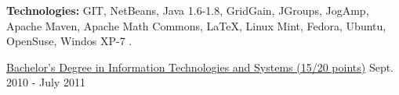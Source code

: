 \begin{cventries}
{\begin{cvitems}
        \item[] {\textbf{Technologies:} \textcolor{rainbowcolor-green}{GIT}, \textcolor{rainbowcolor-green}{NetBeans}, \textcolor{rainbowcolor-indigo}{Java 1.6-1.8}, \textcolor{rainbowcolor-indigo}{GridGain}, \textcolor{rainbowcolor-indigo}{JGroups}, \textcolor{rainbowcolor-indigo}{JogAmp}, \textcolor{rainbowcolor-indigo}{Apache Maven}, \textcolor{rainbowcolor-indigo}{Apache Math Commons}, %
\textcolor{rainbowcolor-indigo}{LaTeX}, %
\textcolor{rainbowcolor-orange}{Linux Mint}, \textcolor{rainbowcolor-orange}{Fedora}, \textcolor{rainbowcolor-orange}{Ubuntu}, \textcolor{rainbowcolor-orange}{OpenSuse}, \textcolor{rainbowcolor-orange}{Windos XP-7}
		.}
      \end{cvitems}
    }
  \cventry
    {\href{https://www.ubi.pt/en/course/64}{Bachelor's Degree in Information Technologies and Systems (15/20 points)}} %
    {} %
    {} %
    {Sept. 2010 - July 2011} %
    {
}
\end{cventries}

